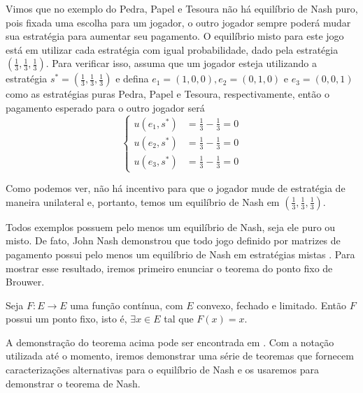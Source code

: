 Vimos que no exemplo do Pedra, Papel e Tesoura não há equilíbrio de Nash puro, pois fixada uma escolha para um jogador, o outro jogador sempre poderá mudar sua estratégia para aumentar seu pagamento. O equilíbrio misto para este jogo está em utilizar cada estratégia com igual probabilidade, dado pela estratégia $(\frac{1}{3},\frac{1}{3},\frac{1}{3})$. Para verificar isso, assuma que um jogador esteja utilizando a estratégia $s^*=(\frac{1}{3},\frac{1}{3},\frac{1}{3})$ e defina $e_1=(1,0,0),e_2=(0,1,0)$ e $e_3=(0,0,1)$ como as estratégias puras Pedra, Papel e Tesoura, respectivamente, então o pagamento esperado para o outro jogador será
\begin{equation}
    \left\{\begin{matrix}
        u(e_1,s^*) & = \frac{1}{3}-\frac{1}{3} =0\\ 
        u(e_2,s^*) & = \frac{1}{3}-\frac{1}{3} =0\\ 
        u(e_3,s^*) & = \frac{1}{3}-\frac{1}{3} =0
    \end{matrix}\right.
\end{equation}

Como podemos ver, não há incentivo para que o jogador mude de estratégia de maneira unilateral e, portanto, temos um equilíbrio de Nash em $(\frac{1}{3},\frac{1}{3},\frac{1}{3})$.

Todos exemplos possuem pelo menos um equilíbrio de Nash, seja ele puro ou misto. De fato, John Nash demonstrou que todo jogo definido por matrizes de pagamento possui pelo menos um equilíbrio de Nash em estratégias mistas \cite{nash1950equilibrium}. Para mostrar esse resultado, iremos primeiro enunciar o teorema do ponto fixo de Brouwer.

\begin{theorem}
\label{teoPontoFixo}
    Seja $F:E\to E$ uma função contínua, com $E$ convexo, fechado e limitado. Então $F$ possui um ponto fixo, isto é, $\exists x\in E$ tal que $F(x)=x$.
\end{theorem}

A demonstração do teorema acima pode ser encontrada em \cite{starr_2011}. Com a notação utilizada até o momento, iremos demonstrar uma série de teoremas \cite{sartini2004introduccao} que fornecem caracterizações alternativas para o equilíbrio de Nash e os usaremos para demonstrar o teorema de Nash.

